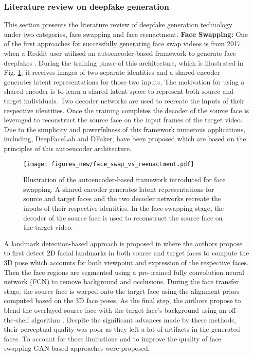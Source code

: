 \subsubsection{Literature review on deepfake generation}
This section presents the literature review of deepfake generation technology under two categories, face swapping and face reenactment. \newline \newline
\textbf{Face Swapping:} One of the first approaches for successfully generating face swap videos is from 2017 when a Reddit user utilised an autoencoder-based framework to generate face deepfakes \cite{waseem2023deepfake}. During the training phase of this architecture, which is illustrated in Fig. \ref{fig:ae_face_swapping}, it receives images of two separate identities and a shared encoder generates latent representations for those two inputs. The motivation for using a shared encoder is to learn a shared latent space to represent both source and target individuals. Two decoder networks are used to recreate the inputs of their respective identities. Once the training completes the decoder of the source face is leveraged to reconstruct the source face on the input frames of the target video. Due to the simplicity and powerfulness of this framework numerous applications, including, DeepFaceLab and DFaker, have been proposed which are based on the principles of this autoencoder architecture.

\begin{figure}
    \centering
    \texttt{[image: figures\_new/face\_swap\_vs\_reenactment.pdf]}
    \caption{Illustration of the autoencoder-based framework introduced for face swapping. A shared encoder generates latent representations for source and target faces and the two decoder networks recreate the inputs of their respective identities. In the face-swapping stage, the decoder of the source face is used to reconstruct the source face on the target video.}
    \label{fig:ae_face_swapping}
\end{figure}

A landmark detection-based approach is proposed in \cite{nirkin2018face} where the authors propose to first detect 2D facial landmarks in both source and target faces to compute the 3D pose which accounts for both viewpoint and expression of the respective faces. Then the face regions are segmented using a pre-trained fully convolution neural network (FCN) to remove background and occlusions. During the face transfer stage, the source face is warped onto the target face using the alignment priors computed based on the 3D face poses. As the final step, the authors propose to blend the overlayed source face with the target face's background using an off-the-shelf algorithm \cite{perez2003poisson}. Despite the significant advances made by these methods, their perceptual quality was poor as they left a lot of artifacts in the generated faces. To account for those limitations and to improve the quality of face swapping GAN-based approaches were proposed. 

